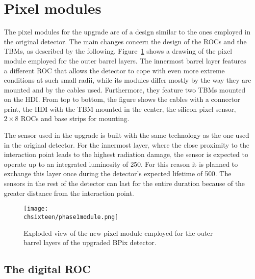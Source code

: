 \section{Pixel modules}

The pixel modules for the upgrade are of a design similar to the ones employed in the original detector. The main changes concern the design of the ROCs and the TBMs, as described by the following.
Figure~\ref{fig:Phase1Mod} shows a drawing of the pixel module employed for the outer barrel layers.
The innermost barrel layer features a different ROC that allows the detector to cope with even more extreme conditions at such small radii, while its modules differ mostly by the way they are mounted and by the cables used. Furthermore, they feature two TBMs mounted on the HDI.
From top to bottom, the figure shows the cables with a connector print, the HDI with the TBM mounted in the center, the silicon pixel sensor, $2\times8$ ROCs and base strips for mounting.

The sensor used in the upgrade is built with the same technology as the one used in the original detector. For the innermost layer, where the close proximity to the interaction point leads to the highest radiation damage, the sensor is expected to operate up to an integrated luminosity of 250\fbinv. For this reason it is planned to exchange this layer once during the detector's expected lifetime of 500\fbinv. The sensors in the rest of the detector can last for the entire duration because of the greater distance from the interaction point.

\begin{figure}[!htb]
 \begin{center}
 \texttt{[image: \\chsixteen/phase1module.png]}
 \end{center}
 \caption{Exploded view of the new pixel module employed for the outer barrel layers of the upgraded BPix detector.}
 \label{fig:Phase1Mod}
\end{figure}

\subsection{The digital ROC}

